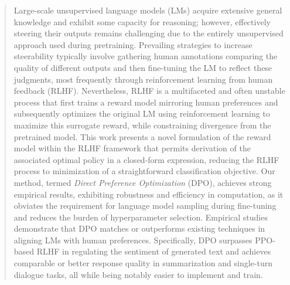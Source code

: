 \begin{abstract}
Large-scale unsupervised language models (LMs) acquire extensive general knowledge and exhibit some capacity for reasoning; however, effectively steering their outputs remains challenging due to the entirely unsupervised approach used during pretraining. Prevailing strategies to increase steerability typically involve gathering human annotations comparing the quality of different outputs and then fine-tuning the LM to reflect these judgments, most frequently through reinforcement learning from human feedback (RLHF). Nevertheless, RLHF is a multifaceted and often unstable process that first trains a reward model mirroring human preferences and subsequently optimizes the original LM using reinforcement learning to maximize this surrogate reward, while constraining divergence from the pretrained model. This work presents a novel formulation of the reward model within the RLHF framework that permits derivation of the associated optimal policy in a closed-form expression, reducing the RLHF process to minimization of a straightforward classification objective. Our method, termed \textit{Direct Preference Optimization} (DPO), achieves strong empirical results, exhibiting robustness and efficiency in computation, as it obviates the requirement for language model sampling during fine-tuning and reduces the burden of hyperparameter selection. Empirical studies demonstrate that DPO matches or outperforms existing techniques in aligning LMs with human preferences. Specifically, DPO surpasses PPO-based RLHF in regulating the sentiment of generated text and achieves comparable or better response quality in summarization and single-turn dialogue tasks, all while being notably easier to implement and train.
\end{abstract}

